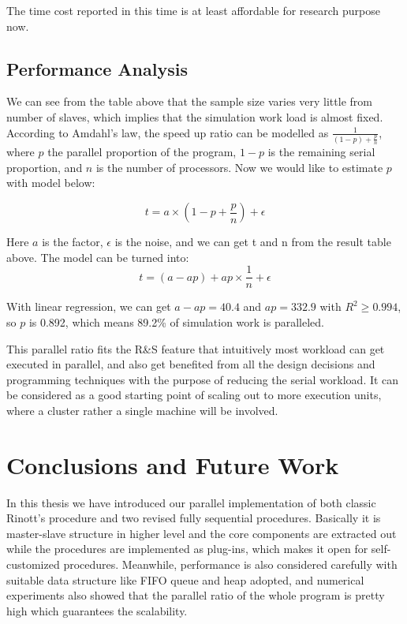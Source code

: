\documentclass[12pt,a4paper]{report}
\begin{document}
The time cost reported in this time is at least affordable for research purpose now.

\section{Performance Analysis}

We can see from the table above that the sample size varies very little from number of slaves, which implies that the simulation work load is almost fixed. According to Amdahl's law, the speed up ratio can be modelled as $\frac{1}{(1 - p) + \frac{p}{n}}$, where $p$ the parallel proportion of the program, $1 - p$ is the remaining serial proportion, and $n$ is the number of processors. Now we would like to estimate $p$ with model below:

$$ t = a \times (1 - p + \frac{p}{n}) + \epsilon $$

Here $a$ is the factor, $\epsilon$ is the noise, and we can get t and n from the result table above. The model can be turned into: 
$$ t = (a - ap) + ap \times \frac{1}{n} + \epsilon $$

With linear regression, we can get $a - ap = 40.4$ and $ap = 332.9$ with $R^2 \geqslant 0.994$, so $p$ is 0.892, which means 89.2\% of simulation work is paralleled.

This parallel ratio fits the R\&S feature that intuitively most workload can get executed in parallel, and also get benefited from all the design decisions and programming techniques with the purpose of reducing the serial workload. It can be considered as a good starting point of scaling out to more execution units, where a cluster rather a single machine will be involved.

\chapter{Conclusions and Future Work}

In this thesis we have introduced our parallel implementation of both classic Rinott's procedure and two revised fully sequential procedures. Basically it is master-slave structure in higher level and the core components are extracted out while the procedures are implemented as plug-ins, which makes it open for self-customized procedures. Meanwhile, performance is also considered carefully with suitable data structure like FIFO queue and heap adopted, and numerical experiments also showed that the parallel ratio of the whole program is pretty high which guarantees the scalability.
\end{document}
